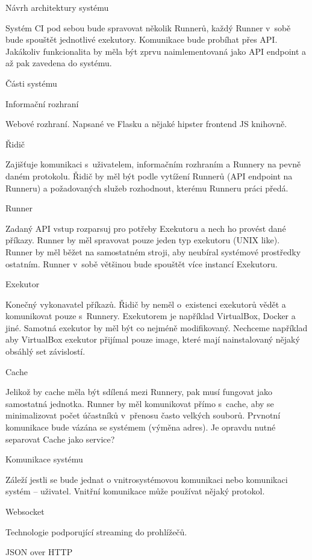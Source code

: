 \chap Návrh architektury systému

Systém CI pod sebou bude spravovat několik Runnerů, každý Runner v~sobě bude spouštět jednotlivé exekutory.
Komunikace bude probíhat přes API.
Jakákoliv funkcionalita by měla být zprvu naimlementovaná jako API endpoint a až pak zavedena do systému.

\sec Části systému

\secc Informační rozhraní

Webové rozhraní. Napsané ve Flasku a nějaké hipster frontend JS knihovně.

\secc Řidič

Zajišťuje komunikaci s~uživatelem, informačním rozhraním a Runnery na pevně daném protokolu.
Řidič by měl být podle vytížení Runnerů (API endpoint na Runneru) a požadovaných služeb rozhodnout, kterému Runneru práci předá.

\secc Runner

Zadaný API vstup rozparsuj pro potřeby Exekutoru a nech ho provést dané příkazy.
Runner by měl spravovat pouze jeden typ exekutoru (UNIX like).
Runner by měl běžet na samostatném stroji, aby neubíral systémové prostředky ostatním.
Runner v~sobě většinou bude spouštět více instancí Exekutoru.

\seccc Exekutor

Konečný vykonavatel příkazů. Řidič by neměl o~existenci exekutorů vědět a komunikovat pouze s~Runnery.
Exekutorem je například VirtualBox, Docker a jiné.
Samotná exekutor by měl být co nejméně modifikovaný.
Nechceme například aby VirtualBox exekutor přijímal pouze image, které mají nainstalovaný nějaký obsáhlý set závislostí.

\secc Cache

Jelikož by cache měla být sdílená mezi Runnery, pak musí fungovat jako samostatná jednotka.
Runner by měl komunikovat přímo s~cache, aby se minimalizovat počet účastníků v~přenosu často velkých souborů.
Prvnotní komunikace bude vázána se systémem (výměna adres).
Je opravdu nutné separovat Cache jako service?

\sec Komunikace systému

Záleží jestli se bude jednat o vnitrosystémovou komunikaci nebo komunikaci systém -- uživatel.
Vnitřní komunikace může používat nějaký  protokol.

\secc Websocket

Technologie podporující streaming do prohlížečů.

\secc JSON over HTTP

